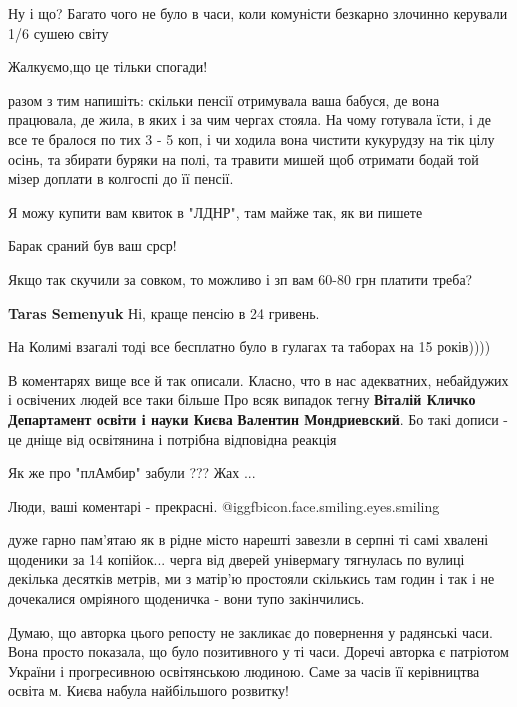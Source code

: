 \begin{itemize}

Ну і що? Багато чого не було в часи, коли комуністи безкарно злочинно керували 1/6 сушею світу

Жалкуємо,що це тільки спогади!

разом з тим напишіть: скільки пенсії отримувала ваша бабуся, де вона працювала, де жила, в яких і за чим чергах стояла. На чому готувала їсти, і де все те бралося по тих 3 - 5 коп, і чи ходила вона чистити кукурудзу на тік цілу осінь, та збирати буряки на полі, та травити мишей щоб отримати бодай той мізер доплати в колгоспі до її пенсії.

Я можу купити вам квиток в "ЛДНР", там майже так, як ви пишете

Барак сраний був ваш срср!

Якщо так скучили за совком, то можливо і зп вам 60-80 грн платити треба?

\begin{itemize} %
\textbf{Taras Semenyuk}
Ні, краще пенсію в 24 гривень.
\end{itemize} %

На Колимі взагалі тоді все бесплатно було в гулагах та таборах на 15 років))))

В коментарях вище все й так описали.
Класно, что в нас адекватних, небайдужих і освічених людей все таки більше
Про всяк випадок тегну \textbf{Віталій Кличко}
\textbf{Департамент освіти і науки Києва}
\textbf{Валентин Мондриевский}.
Бо такі дописи - це дніще від освітянина і потрібна відповідна реакція

Як же про "плАмбир" забули ??? Жах ...

Люди, ваші коментарі - прекрасні.  @igg{fbicon.face.smiling.eyes.smiling} 


дуже гарно пам'ятаю як в рідне місто нарешті завезли в серпні ті самі хвалені
щоденики за 14 копійок... черга від дверей універмагу тягнулась по вулиці
декілька десятків метрів, ми з матір'ю простояли скількись там годин і так і не
дочекалися омріяного щоденичка - вони тупо закінчились.



Думаю, що авторка цього репосту не закликає до повернення у радянські часи.
Вона просто показала, що було позитивного у ті часи. Доречі авторка є патріотом
України і прогресивною освітянською людиною. Саме за часів її керівництва
освіта м. Києва набула найбільшого розвитку!


\end{itemize}
